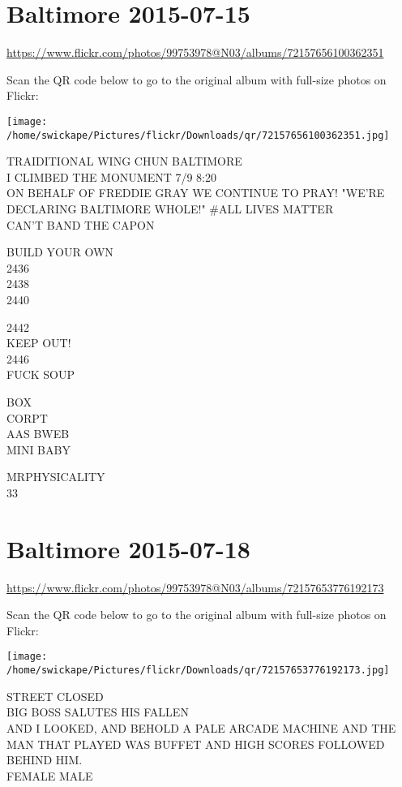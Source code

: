 \documentclass[10pt,letterpaper]{article}
\begin{document}
\section*{Baltimore 2015-07-15}

\url{https://www.flickr.com/photos/99753978@N03/albums/72157656100362351}

Scan the QR code below to go to the original album with full-size photos on Flickr:

\texttt{[image: /home/swickape/Pictures/flickr/Downloads/qr/72157656100362351.jpg]}


TRAIDITIONAL WING CHUN BALTIMORE\\
I CLIMBED THE MONUMENT 7/9 8:20\\
ON BEHALF OF FREDDIE GRAY WE CONTINUE TO PRAY!  "WE'RE DECLARING BALTIMORE WHOLE!"  \#ALL LIVES MATTER\\
CAN'T BAND THE CAPON

BUILD YOUR OWN\\
2436\\
2438\\
2440

2442\\
KEEP OUT!\\
2446\\
FUCK SOUP

BOX\\
CORPT\\
AAS BWEB\\
MINI BABY

MRPHYSICALITY\\
33


\section*{Baltimore 2015-07-18}

\url{https://www.flickr.com/photos/99753978@N03/albums/72157653776192173}

Scan the QR code below to go to the original album with full-size photos on Flickr:

\texttt{[image: /home/swickape/Pictures/flickr/Downloads/qr/72157653776192173.jpg]}


STREET CLOSED\\
BIG BOSS SALUTES HIS FALLEN\\
AND I LOOKED, AND BEHOLD A PALE ARCADE MACHINE AND THE MAN THAT PLAYED WAS BUFFET AND HIGH SCORES FOLLOWED BEHIND HIM.\\
FEMALE MALE
\end{document}
